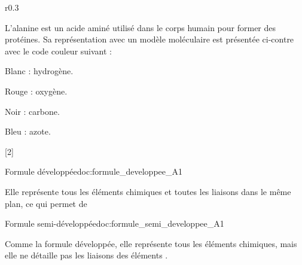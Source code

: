 \vspace*{8pt}
\begin{wrapfigure}[5]{r}{0.3\linewidth}
  \vspace*{-22pt}
\end{wrapfigure}

L'alanine est un acide aminé utilisé dans le corps humain pour former des protéines.
Sa représentation avec un modèle moléculaire est présentée ci-contre avec le code couleur suivant :
\begin{listePoints}[2]
  \item Blanc : hydrogène.
  \item Rouge : oxygène.
  \item Noir : carbone.
  \item Bleu : azote.
\end{listePoints}

\medskip
{}[2]



\newpage
\vspace*{-30pt}
\begin{doc}{Formule développée}{doc:formule_developpee_A1}
  \begin{importants}  
    Elle représente tous les éléments chimiques et toutes les liaisons dans le même plan, ce qui permet de 
  \end{importants}

  \exemple*
  \vspace*{-18pt}
  \begin{center}
    \qq{}
  \end{center}
\end{doc}


\begin{doc}{Formule semi-développée}{doc:formule_semi_developpee_A1}
  \begin{importants}
    Comme la formule développée, elle représente tous les éléments chimiques, mais elle ne détaille pas les liaisons des éléments .
  \end{importants}

  \exemple*
  \vspace*{-8pt}
  \begin{center}
    \qq{}
  \end{center}
\end{doc}

